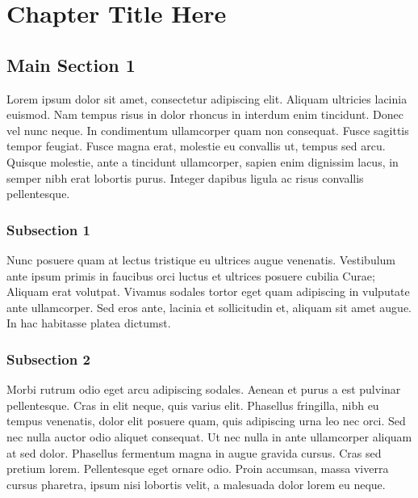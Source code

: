 
\chapter{Chapter Title Here} %

\label{ChapterX} %


\section{Main Section 1}

Lorem ipsum dolor sit amet, consectetur adipiscing elit. Aliquam ultricies
lacinia euismod. Nam tempus risus in dolor rhoncus in interdum enim tincidunt.
Donec vel nunc neque. In condimentum ullamcorper quam non consequat. Fusce
sagittis tempor feugiat. Fusce magna erat, molestie eu convallis ut, tempus sed
arcu. Quisque molestie, ante a tincidunt ullamcorper, sapien enim dignissim
lacus, in semper nibh erat lobortis purus. Integer dapibus ligula ac risus
convallis pellentesque.

\subsection{Subsection 1}

Nunc posuere quam at lectus tristique eu ultrices augue venenatis. Vestibulum
ante ipsum primis in faucibus orci luctus et ultrices posuere cubilia Curae;
Aliquam erat volutpat. Vivamus sodales tortor eget quam adipiscing in vulputate
ante ullamcorper. Sed eros ante, lacinia et sollicitudin et, aliquam sit amet
augue. In hac habitasse platea dictumst.


\subsection{Subsection 2}
Morbi rutrum odio eget arcu adipiscing sodales. Aenean et purus a est pulvinar
pellentesque. Cras in elit neque, quis varius elit. Phasellus fringilla, nibh
eu tempus venenatis, dolor elit posuere quam, quis adipiscing urna leo nec
orci. Sed nec nulla auctor odio aliquet consequat. Ut nec nulla in ante
ullamcorper aliquam at sed dolor. Phasellus fermentum magna in augue gravida
cursus. Cras sed pretium lorem. Pellentesque eget ornare odio. Proin accumsan,
massa viverra cursus pharetra, ipsum nisi lobortis velit, a malesuada dolor
lorem eu neque.

